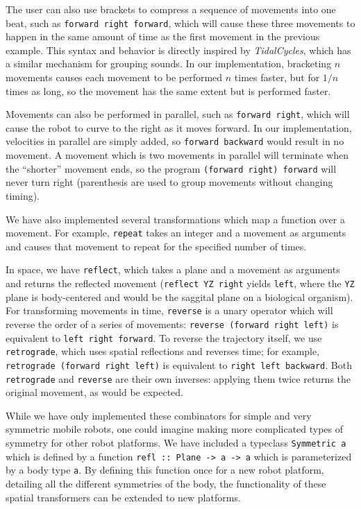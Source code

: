 \documentclass[sigconf]{acmart}
\begin{document}
The user can also use brackets to compress a sequence of movements into
one beat, such as \texttt{forward right forward}, which will
cause these three movements to happen in the same amount of time as the
first movement in the previous example. This syntax and behavior is directly 
inspired by \emph{TidalCycles}, which has a similar mechanism for grouping
sounds. In our implementation,
bracketing $n$ movements causes each movement to be performed $n$
times faster, but for $1/n$ times as long, so the movement has the
same extent but is performed faster.

Movements can also be performed in parallel, such as
\texttt{forward \textbar{}\textbar{} right}, which will cause the
robot to curve to the right as it moves forward. In our implementation,
velocities in parallel are simply added, so
\texttt{forward \textbar{}\textbar{} backward} would result in no
movement. A movement which is two movements in parallel will terminate
when the ``shorter'' movement ends, so the program
\texttt{(forward right) \textbar{}\textbar{} forward} will never turn
right (parenthesis are used to group movements without changing timing).

We have also implemented several transformations which map a function
over a movement. For example, \texttt{repeat} takes an integer and a
movement as arguments and causes that movement to repeat for the
specified number of times.

In space, we have \texttt{reflect}, which takes a plane and a movement
as arguments and returns the reflected movement
(\texttt{reflect\ YZ\ right} yields \texttt{left}, where the \texttt{YZ}
plane is body-centered and would be the saggital plane on a biological
organism). For transforming movements in time, \texttt{reverse} is a
unary operator which will reverse the order of a series of movements:
\texttt{reverse\ (forward\ right\ left)} is equivalent to
\texttt{left\ right\ forward}. To reverse the trajectory itself, we use
\texttt{retrograde}, which uses spatial reflections and reverses time;
for example, \texttt{retrograde\ (forward\ right\ left)} is equivalent
to \texttt{right\ left\ backward}. Both \texttt{retrograde} and
\texttt{reverse} are their own inverses: applying them twice returns the
original movement, as would be expected.

While we have only implemented these combinators for simple and very
symmetric mobile robots, one could imagine making more complicated types
of symmetry for other robot platforms. We have included a typeclass
\texttt{Symmetric\ a} which is defined by a function
\texttt{refl\ ::\ Plane\ -\textgreater{}\ a\ -\textgreater{}\ a} which
is parameterized by a body type \texttt{a}. By defining this function
once for a new robot platform, detailing all the different symmetries of
the body, the functionality of these spatial transformers can be
extended to new platforms.
\end{document}
